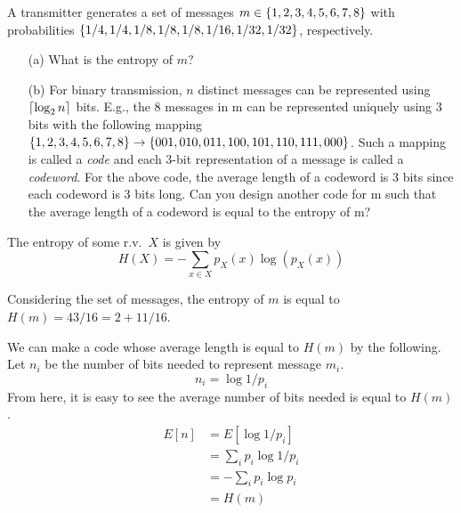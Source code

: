 \documentclass{article}
\begin{document}
    \begin{problem}
        A transmitter generates a set of messages $m \in \{1, 2, 3, 4, 5, 6, 7, 8\}$ with probabilities $\{1/4, 1/4, 1/8, 1/8, 1/8, 1/16, 1/32, 1/32\}$, respectively.
        \begin{enumerate}
            \item[(a)] What is the entropy of $m$?
            \item[(b)] For binary transmission, $n$ distinct messages can be represented using $\lceil \log_2{n} \rceil$ bits. E.g., the 8 messages in m can be represented uniquely using 3 bits with the following mapping $\{1, 2, 3, 4, 5, 6, 7, 8\} \rightarrow \{001, 010, 011, 100, 101, 110, 111, 000\}$. Such a mapping is called a \emph{code} and each 3-bit representation of a message is called a \emph{codeword}.  For the above code, the average length of a codeword is 3 bits since each codeword is 3 bits long. Can you design another code for m such that the average length of a codeword is equal to the entropy of m?
        \end{enumerate}
    \end{problem}

    \begin{solution}
        The entropy of some r.v.~$X$ is given by
        \begin{equation*}
            H(X) = -\sum_{x \in X}p_X(x) \log(p_X(x))
        \end{equation*}
    \end{solution}
    Considering the set of messages, the entropy of $m$ is equal to $\boxed{H(m) = 43/16 = 2 + 11/16}$.

    We can make a code whose average length is equal to $H(m)$ by the following. Let $n_i$ be the number of bits needed to represent message $m_i$.
    \begin{equation}
        n_i = \log{1/p_i}
    \end{equation}
    From here, it is easy to see the average number of bits needed is equal to $H(m)$.
    \begin{align*}
        E[n] &= E[\log{1/p_i}] \\
        &= \sum_i p_i \log{1/p_i} \\
        &= -\sum_i p_i \log{p_i} \\
        &= H(m)
    \end{align*}
\end{document}
